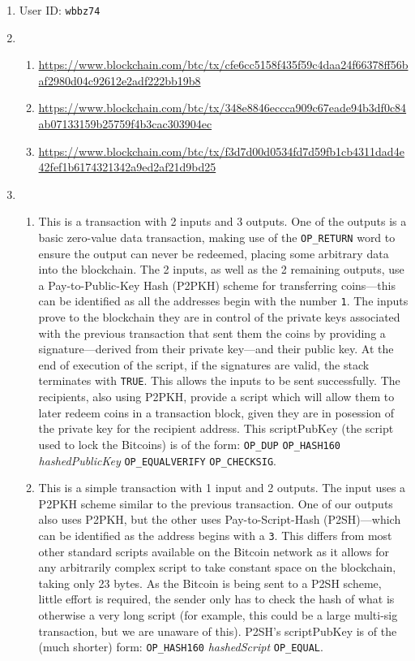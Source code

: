 \documentclass[11pt]{article}
\begin{document}
\begin{enumerate}
\item User ID: \texttt{wbbz74}
\item 
\begin{enumerate}
\item \url{https://www.blockchain.com/btc/tx/cfe6cc5158f435f59c4daa24f66378ff56baf2980d04c92612e2adf222bb19b8}
\item \url{https://www.blockchain.com/btc/tx/348e8846eccca909c67eade94b3df0c84ab07133159b25759f4b3cac303904ec}
\item \url{https://www.blockchain.com/btc/tx/f3d7d00d0534fd7d59fb1cb4311dad4e42fef1b6174321342a9ed2af21d9bd25}
\end{enumerate}
\item 
\begin{enumerate}

\item This is a transaction with 2 inputs and 3 outputs. One of the outputs is a basic zero-value data transaction, making use of the \texttt{OP\_RETURN} word to ensure the output can never be redeemed, placing some arbitrary data into the blockchain. 
The 2 inputs, as well as the 2 remaining outputs, use a Pay-to-Public-Key Hash (P2PKH) scheme for transferring coins---this can be identified as all the addresses begin with the number \texttt{1}. 
The inputs prove to the blockchain they are in control of the private keys associated with the previous transaction that sent them the coins by providing a signature---derived from their private key---and their public key. 
At the end of execution of the script, if the signatures are valid, the stack terminates with \texttt{TRUE}. This allows the inputs to be sent successfully. 
The recipients, also using P2PKH, provide a script which will allow them to later redeem coins in a transaction block, given they are in posession of the private key for the recipient address. This scriptPubKey (the script used to lock the Bitcoins) is of the form: \texttt{OP\_DUP} \texttt{OP\_HASH160} \textit{hashedPublicKey} \texttt{OP\_EQUALVERIFY} \texttt{OP\_CHECKSIG}.

\item This is a simple transaction with 1 input and 2 outputs. The input uses a P2PKH scheme similar to the previous transaction. One of our outputs also uses P2PKH, but the other uses Pay-to-Script-Hash (P2SH)---which can be identified as the address begins with a \texttt{3}. This differs from most other standard scripts available on the Bitcoin network as it allows for any arbitrarily complex script to take constant space on the blockchain, taking only 23 bytes. As the Bitcoin is being sent to a P2SH scheme, little effort is required, the sender only has to check the hash of what is otherwise a very long script (for example, this could be a large multi-sig transaction, but we are unaware of this). P2SH's scriptPubKey is of the (much shorter) form: \texttt{OP\_HASH160} \textit{hashedScript} \texttt{OP\_EQUAL}.


\end{enumerate}
\end{enumerate}
\end{document}
